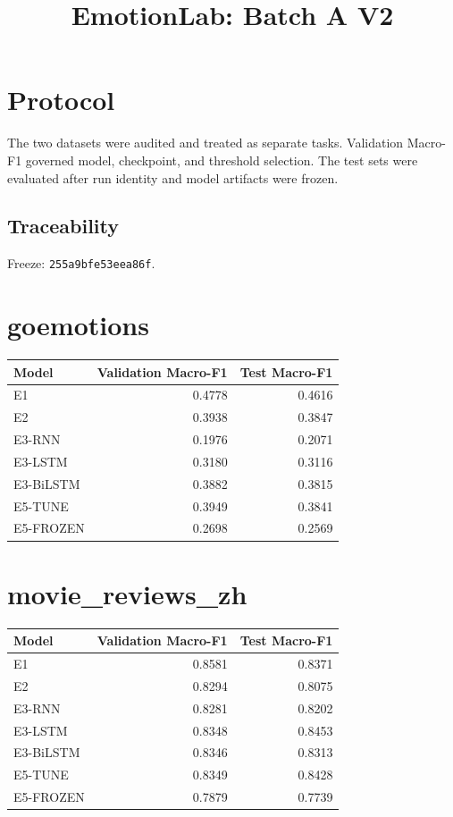 \documentclass{article}
\begin{document}
\title{EmotionLab: Batch A V2}
\maketitle
\section{Protocol}
The two datasets were audited and treated as separate tasks. Validation Macro-F1 governed model, checkpoint, and threshold selection. The test sets were evaluated after run identity and model artifacts were frozen.
\subsection{Traceability}
Freeze: \texttt{255a9bfe53eea86f}.

\section{goemotions}

\begin{tabular}{lrr}
Model & Validation Macro-F1 & Test Macro-F1 \\
\hline
E1 & 0.4778 & 0.4616 \\
E2 & 0.3938 & 0.3847 \\
E3-RNN & 0.1976 & 0.2071 \\
E3-LSTM & 0.3180 & 0.3116 \\
E3-BiLSTM & 0.3882 & 0.3815 \\
E5-TUNE & 0.3949 & 0.3841 \\
E5-FROZEN & 0.2698 & 0.2569 \\
\end{tabular}

\section{movie\_reviews\_zh}

\begin{tabular}{lrr}
Model & Validation Macro-F1 & Test Macro-F1 \\
\hline
E1 & 0.8581 & 0.8371 \\
E2 & 0.8294 & 0.8075 \\
E3-RNN & 0.8281 & 0.8202 \\
E3-LSTM & 0.8348 & 0.8453 \\
E3-BiLSTM & 0.8346 & 0.8313 \\
E5-TUNE & 0.8349 & 0.8428 \\
E5-FROZEN & 0.7879 & 0.7739 \\
\end{tabular}
\end{document}
